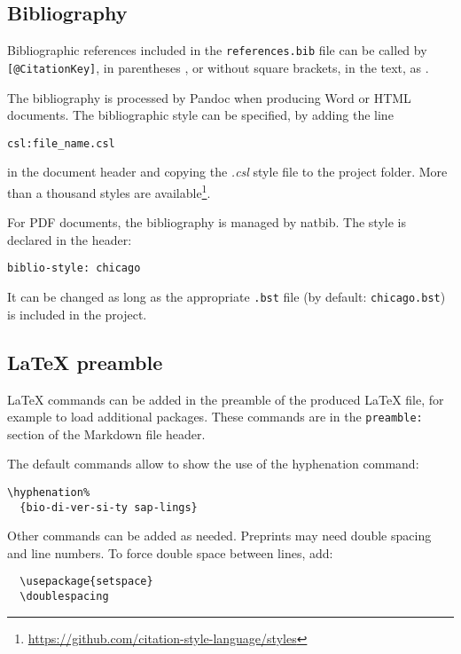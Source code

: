 \documentclass[fleqn,]{article} %
\begin{document}
\hypertarget{bibliography}{%
\subsection{Bibliography}\label{bibliography}}

Bibliographic references included in the \texttt{references.bib} file can be called by \texttt{{[}@CitationKey{]}}, in parentheses \citep{Xie2016}, or without square brackets, in the text, as \citet{Xie2018} .

The bibliography is processed by Pandoc when producing Word or HTML documents.
The bibliographic style can be specified, by adding the line

\begin{verbatim}
csl:file_name.csl
\end{verbatim}

in the document header and copying the \emph{.csl} style file to the project folder.
More than a thousand styles are available\footnote{\url{https://github.com/citation-style-language/styles}}.

For PDF documents, the bibliography is managed by natbib.
The style is declared in the header:

\begin{verbatim}
biblio-style: chicago
\end{verbatim}

It can be changed as long as the appropriate \texttt{.bst} file (by default: \texttt{chicago.bst}) is included in the project.

\hypertarget{latex-preamble}{%
\subsection{LaTeX preamble}\label{latex-preamble}}

LaTeX commands can be added in the preamble of the produced LaTeX file, for example to load additional packages.
These commands are in the \texttt{preamble:} section of the Markdown file header.

The default commands allow to show the use of the hyphenation command:

\begin{verbatim}
\hyphenation%
  {bio-di-ver-si-ty sap-lings}
\end{verbatim}

Other commands can be added as needed.
Preprints may need double spacing and line numbers.
To force double space between lines, add:

\begin{verbatim}
  \usepackage{setspace}
  \doublespacing
\end{verbatim}
\end{document}
